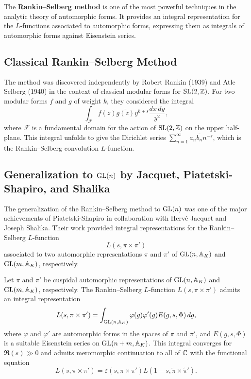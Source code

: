 The \textbf{Rankin--Selberg method} is one of the most powerful techniques in the analytic theory of automorphic forms. It provides an integral representation for the \(L\)-functions associated to automorphic forms, expressing them as integrals of automorphic forms against Eisenstein series.

\subsection{Classical Rankin--Selberg Method}

The method was discovered independently by Robert Rankin (1939) and Atle Selberg (1940) in the context of classical modular forms for \(\operatorname{SL}(2,\mathbb{Z})\). For two modular forms \(f\) and \(g\) of weight \(k\), they considered the integral
\[
\int_{\mathcal{F}} f(z) \overline{g(z)} y^{k+s} \frac{dx\,dy}{y^2},
\]
where \(\mathcal{F}\) is a fundamental domain for the action of \(\operatorname{SL}(2,\mathbb{Z})\) on the upper half-plane. This integral unfolds to give the Dirichlet series \(\sum_{n=1}^\infty a_n \overline{b_n} n^{-s}\), which is the Rankin--Selberg convolution \(L\)-function.

\subsection{Generalization to \texorpdfstring{\(\operatorname{GL}(n)\)}{GL(n)} by Jacquet, Piatetski-Shapiro, and Shalika}

The generalization of the Rankin--Selberg method to \(\operatorname{GL}(n)\) was one of the major achievements of Piatetski-Shapiro in collaboration with Herv\'{e} Jacquet and Joseph Shalika. Their work provided integral representations for the Rankin--Selberg \(L\)-function
\[
L(s, \pi \times \pi')
\]
associated to two automorphic representations \(\pi\) and \(\pi'\) of \(\operatorname{GL}(n,\mathbb{A}_K)\) and \(\operatorname{GL}(m,\mathbb{A}_K)\), respectively.

\begin{theorem}
Let \(\pi\) and \(\pi'\) be cuspidal automorphic representations of \(\operatorname{GL}(n,\mathbb{A}_K)\) and \(\operatorname{GL}(m,\mathbb{A}_K)\), respectively. The Rankin--Selberg \(L\)-function \(L(s, \pi \times \pi')\) admits an integral representation
\[
L(s, \pi \times \pi') = \int_{\operatorname{GL}(n,\mathbb{A}_K)} \varphi(g) \varphi'(g) E(g, s, \Phi)\, dg,
\]
where \(\varphi\) and \(\varphi'\) are automorphic forms in the spaces of \(\pi\) and \(\pi'\), and \(E(g, s, \Phi)\) is a suitable Eisenstein series on \(\operatorname{GL}(n+m,\mathbb{A}_K)\). This integral converges for \(\Re(s) \gg 0\) and admits meromorphic continuation to all of \(\mathbb{C}\) with the functional equation
\[
L(s, \pi \times \pi') = \varepsilon(s, \pi \times \pi') L(1-s, \widetilde{\pi} \times \widetilde{\pi}').
\]
\end{theorem}

